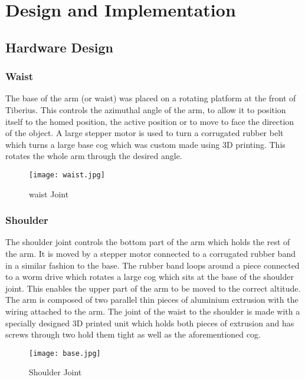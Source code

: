 \section{Design and Implementation}

\subsection{Hardware Design}


\subsubsection{Waist}
The base of the arm (or waist) was placed on a rotating platform at the front of Tiberius.  This controls the azimuthal angle of the arm, to allow it to position itself to the homed position, the active position or to move to face the direction of the object.  A large stepper motor is used to turn a corrugated rubber belt which turns a large base cog which was custom made using 3D printing.  This rotates the whole arm through the desired angle.

\begin{figure}[!htb]
\begin{center}
\texttt{[image: waist.jpg]}
\end{center}
\caption{waist Joint}
\label{fig:waist}
\end{figure}

\subsubsection{Shoulder}
The shoulder joint controls the bottom part of the arm which holds the rest of the arm.  It is moved by a stepper motor connected to a corrugated rubber band in a similar fashion to the base.  The rubber band loops around a piece connected to a worm drive which rotates a large cog which sits at the base of the shoulder joint.  This enables the upper part of the arm to be moved to the correct altitude.  The arm is composed of two parallel thin pieces of aluminium extrusion with the wiring attached to the arm.  The joint of the waist to the shoulder is made with a specially designed 3D printed unit which holds both pieces of extrusion and has screws through two hold them tight as well as the aforementioned cog.  

\begin{figure}[!htb]
\begin{center}
\texttt{[image: base.jpg]}
\end{center}
\caption{Shoulder Joint}
\label{fig:shoulder}
\end{figure}


